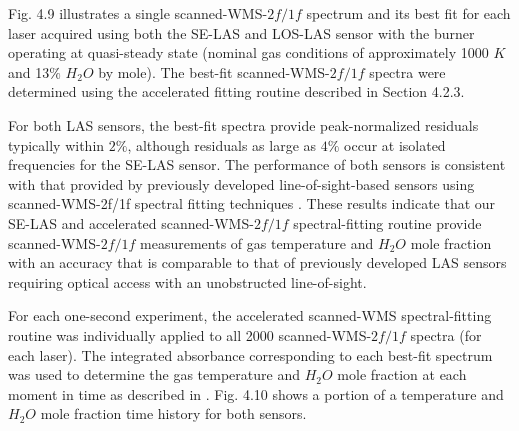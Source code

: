 Fig. 4.9 illustrates a single scanned-WMS-$2f/1f$ spectrum and its best fit for each laser acquired using both the SE-LAS and LOS-LAS sensor with the burner operating at quasi-steady state (nominal gas conditions of approximately 1000 $K$ and 13$\%$ $H_2O$ by mole). The best-fit scanned-WMS-$2f/1f$ spectra were determined using the accelerated fitting routine described in Section 4.2.3. 


For both LAS sensors, the best-fit spectra provide peak-normalized residuals typically within $2\%$, although residuals as large as $4\%$ occur at isolated frequencies for the SE-LAS sensor. The performance of both sensors is consistent with that provided by previously developed line-of-sight-based sensors using scanned-WMS-2f/1f spectral fitting techniques \cite{Makowiecki2017,Goldenstein2014,goldenstein2014scanned,spearrin2014simultaneous}. These results indicate that our SE-LAS and accelerated scanned-WMS-$2f/1f$ spectral-fitting routine provide scanned-WMS-$2f/1f$ measurements of gas temperature and $H_2O$ mole fraction with an accuracy that is comparable to that of previously developed LAS sensors requiring optical access with an unobstructed line-of-sight.

For each one-second experiment, the accelerated scanned-WMS spectral-fitting routine was individually applied to all 2000 scanned-WMS-$2f/1f$ spectra (for each laser). The integrated absorbance corresponding to each best-fit spectrum was used to determine the gas temperature and $H_2O$ mole fraction at each moment in time as described in \cite{Goldenstein2014}. Fig. 4.10 shows a portion of a temperature and $H_2O$ mole fraction time history for both sensors.

